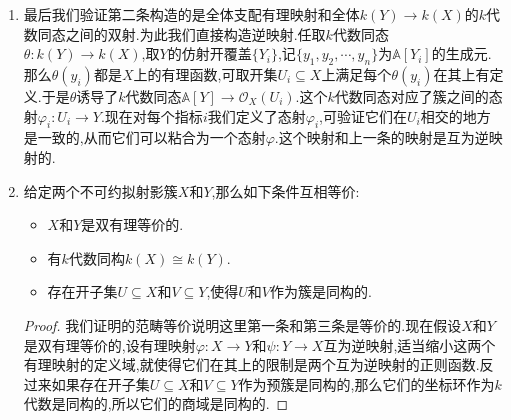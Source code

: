 \begin{enumerate}
\begin{proof}
		容易验证两个有理映射的复合仍然是有理映射.假设$\varphi$的定义域为$U$,$\psi$的定义域为$V$,那么有理映射$\psi\circ\varphi$的定义域为$U\cap\varphi^{-1}(V)$.现在假设$\overline{\varphi(U)}=Y$和$\overline{\psi(V)}=Z$.任取$Z$中的开集$T$,那么不可约性说明$\psi^{-1}(T)\cap V$是$Y$的非空开子集.按照$\overline{\varphi(U)}=Y$,说明存在$x\in U$,使得$\varphi(x)\in\psi^{-1}(T)\cap Y$,于是$x\in U\cap\varphi^{-1}(V)$,并且$\psi\circ\varphi(x)\in T$.于是$\psi\circ\varphi$是支配的.
	\end{proof}
	\item 最后我们验证第二条构造的是全体支配有理映射和全体$k(Y)\to k(X)$的$k$代数同态之间的双射.为此我们直接构造逆映射.任取$k$代数同态$\theta:k(Y)\to k(X)$,取$Y$的仿射开覆盖$\{Y_i\}$,记$\{y_1,y_2,\cdots,y_n\}$为$\mathbb{A}[Y_i]$的生成元.那么$\theta(y_i)$都是$X$上的有理函数,可取开集$U_i\subseteq X$上满足每个$\theta(y_i)$在其上有定义.于是$\theta$诱导了$k$代数同态$\mathbb{A}[Y]\to\mathscr{O}_X(U_i)$.这个$k$代数同态对应了簇之间的态射$\varphi_i:U_i\to Y$.现在对每个指标$i$我们定义了态射$\varphi_i$,可验证它们在$U_i$相交的地方是一致的,从而它们可以粘合为一个态射$\varphi$.这个映射和上一条的映射是互为逆映射的.
	\item 给定两个不可约拟射影簇$X$和$Y$,那么如下条件互相等价:
	\begin{itemize}
		\item $X$和$Y$是双有理等价的.
		\item 有$k$代数同构$k(X)\cong k(Y)$.
		\item 存在开子集$U\subseteq X$和$V\subseteq Y$,使得$U$和$V$作为簇是同构的.
	\end{itemize}
	\begin{proof}
		
		我们证明的范畴等价说明这里第一条和第三条是等价的.现在假设$X$和$Y$是双有理等价的,设有理映射$\varphi:X\to Y$和$\psi:Y\to X$互为逆映射,适当缩小这两个有理映射的定义域,就使得它们在其上的限制是两个互为逆映射的正则函数.反过来如果存在开子集$U\subseteq X$和$V\subseteq Y$作为预簇是同构的,那么它们的坐标环作为$k$代数是同构的,所以它们的商域是同构的.
	\end{proof}
\end{enumerate}

